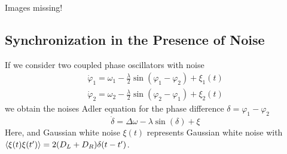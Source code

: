 \documentclass{/home/ben/Templates/notebook}
\begin{document}
	Images missing!
	
	
	\subsection*{Synchronization in the Presence of Noise}
	
	If we consider two coupled phase oscillators with noise
	\begin{gather}
		\dot{\varphi}_1 = \omega_1 - \frac{\lambda}{2} \sin(\varphi_1 - \varphi_2) + \xi_1(t) \\
		\dot{\varphi}_2 = \omega_2 - \frac{\lambda}{2} \sin(\varphi_2 - \varphi_1) + \xi_2(t)
	\end{gather}
	we obtain the noises Adler equation for the phase difference $\delta = \varphi_1 - \varphi_2$
	\begin{equation}
	\dot{\delta} = \Delta \omega - \lambda \sin(\delta) + \xi
	\end{equation}
	Here, and Gaussian white noise $\xi(t)$ represents Gaussian white noise with $\expval{\xi(t)\xi(t')} = 2 (D_L + D_R) \delta(t-t')$.
	
\end{document}

